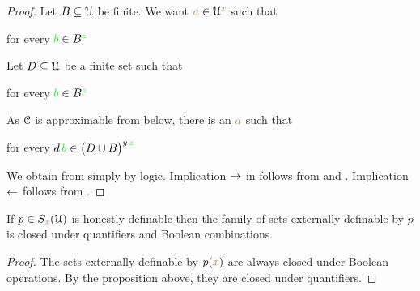 \begin{proof}
Let $B\subseteq\EuScript U$ be finite. 
We want ${\color{brown} a}\in\EuScript U^{\color{brown} x}$ such that 

\hfill for every ${\color{green} b}\in B^{\color{green} z}$


Let $D\subseteq\EuScript U$ be a finite set such that 

\hfill for every ${\color{green} b}\in B^{\color{green} z}$

As $\EuScript C$ is approximable from below, there is an ${\color{brown} a}$ such that

\hfill for every $d\,{\color{green} b}\in \big(D\cup B\big)^{y\,{\color{green} z}}$


We obtain  from  simply by logic. 
Implication $\rightarrow$ in  follows from  and . 
Implication $\leftarrow$ follows from .
\end{proof}



\begin{corollary}
If $p\in S_{{\color{brown} x}}(\EuScript U)$ is honestly definable then the family of sets externally definable by $p$ is closed under quantifiers and Boolean combinations. 
\end{corollary}

\begin{proof}
The sets externally definable by $p({\color{brown} x})$ are always closed under Boolean operations. By the proposition above, they are closed under quantifiers. 
\end{proof}


